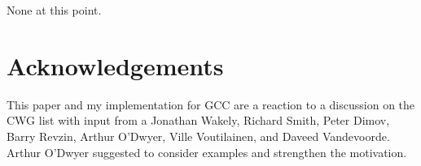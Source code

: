 None at this point.

\section{Acknowledgements}

This paper and my implementation for GCC are a reaction to a discussion on the CWG list 
with input from a Jonathan Wakely, Richard Smith, Peter Dimov, Barry Revzin, Arthur 
O'Dwyer, Ville Voutilainen, and Daveed Vandevoorde.
Arthur O'Dwyer suggested to consider  examples and strengthen 
the motivation.


